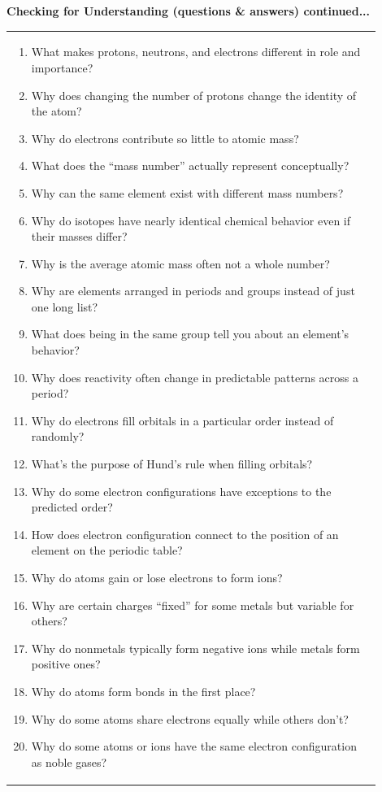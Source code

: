 \documentclass{article}
\begin{document}
\newpage
\noindent
{\large\textbf{Checking for Understanding (questions \& answers) continued...} \\
\vspace{0.2cm}
\begin{tabular}{|p{0.9\linewidth}|}
\hline
\begin{enumerate}
\item What makes protons, neutrons, and electrons different in role and importance?  
\item Why does changing the number of protons change the identity of the atom?  
\item Why do electrons contribute so little to atomic mass?  
\item What does the “mass number” actually represent conceptually?  
\item Why can the same element exist with different mass numbers?  
\item Why do isotopes have nearly identical chemical behavior even if their masses differ?  
\item Why is the average atomic mass often not a whole number?  
\item Why are elements arranged in periods and groups instead of just one long list?  
\item What does being in the same group tell you about an element’s behavior?  
\item Why does reactivity often change in predictable patterns across a period?  
\item Why do electrons fill orbitals in a particular order instead of randomly?  
\item What’s the purpose of Hund’s rule when filling orbitals?  
\item Why do some electron configurations have exceptions to the predicted order?  
\item How does electron configuration connect to the position of an element on the periodic table?  
\item Why do atoms gain or lose electrons to form ions?  
\item Why are certain charges “fixed” for some metals but variable for others?  
\item Why do nonmetals typically form negative ions while metals form positive ones?  
\item Why do atoms form bonds in the first place?  
\item Why do some atoms share electrons equally while others don’t?  
\item Why do some atoms or ions have the same electron configuration as noble gases?  

\end{enumerate}
\end{tabular}}
\end{document}
